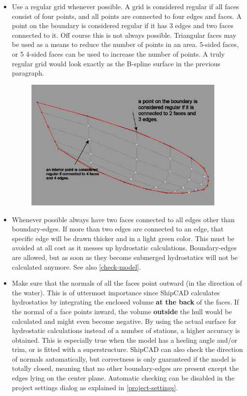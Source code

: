 \documentclass[12pt]{article}
\begin{document}
\begin{itemize}

  \item Use a regular grid whenever possible. A grid is considered
regular if all faces consist of four points, and all points are
connected to four edges and faces. A point on the boundary is
considered regular if it has 3 edges and two faces connected to
it. Off course this is not always possible.  Triangular faces may be
used as a means to reduce the number of points in an area.  5-sided
faces, or 5 4-sided faces can be used to increase the number of
points. A truly regular grid would look exactly as the B-spline
surface in the previous paragraph.

\begin{figure}[h]
        \centering
        \includegraphics[width=10cm,natwidth=583,natheight=386]{figure7.png}
        \caption{}
        \label{fig:mesh6}
\end{figure}

  \item Whenever possible always have two faces connected to all edges
other than boundary-edges. If more than two edges are connected to an
edge, that specific edge will be drawn thicker and in a light green
color. This must be avoided at all cost as it messes up hydrostatic
calculations. Boundary-edges are allowed, but as soon as they become
submerged hydrostatics will not be calculated anymore. See also \ref{check-model}.

  \item Make sure that the normals of all the faces point outward (in
the direction of the water). This is of uttermost importance since
ShipCAD calculates hydrostatics by integrating the enclosed
volume \textbf{at the back} of the faces. If the normal of a face
points inward, the volume \textbf{outside} the hull would be
calculated and might even become negative. By using the actual surface
for hydrostatic calculations instead of a number of stations, a higher
accuracy is obtained. This is especially true when the model has a
heeling angle and/or trim, or is fitted with a superstructure. ShipCAD
can also check the direction of normals automatically, but correctness
is only guaranteed if the model is totally closed, meaning that no
other boundary-edges are present except the edges lying on the center
plane. Automatic checking can be disabled in the project settings
dialog as explained in \ref{project-settings}.

\end{itemize}
\end{document}
